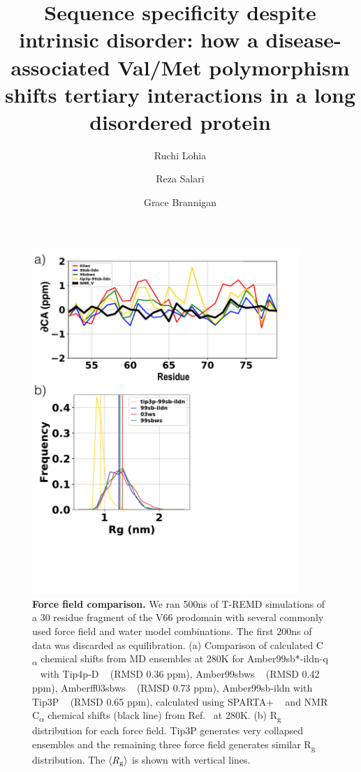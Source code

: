 \documentclass[journal=jacsat,manuscript=article]{achemso}
\author{Ruchi Lohia}
\author{Reza Salari}
\author{Grace Brannigan}
\affiliation[Rutgers University]
{Center for Computational and Integrative Biology, Rutgers University, Camden, NJ, USA}
\title[An \textsf{achemso} demo]
  {Sequence specificity despite intrinsic disorder: how a disease-associated  Val/Met polymorphism shifts tertiary interactions in a long disordered protein}
\begin{document}
\clearpage


\begin{figure}[!ht]
\includegraphics[scale=0.5,width=0.9\textwidth,trim={0 0cm 0 0cm},clip]{../figures/S1.pdf}
\caption{{\bf Force field comparison.} We ran 500ns of T-REMD simulations of a 30 residue fragment of the V66 prodomain with several commonly used force field and water model combinations. The first 200ns of data was discarded as equilibration. (a) Comparison of calculated C\textsubscript{$\alpha$} chemical shifts from MD ensembles at 280K for Amber99sb*-ildn-q ~\cite {Lindorff-Larsen2010a, Hornak2006a} with Tip4p-D ~\cite {Piana2015} (RMSD 0.36 ppm),  Amber99sbws ~\cite {Lindorff-Larsen2010a, Best2014} (RMSD 0.42 ppm), Amberff03sbws  ~\cite {Best2009, Best2014} (RMSD 0.73 ppm), Amber99sb-ildn with Tip3P ~\cite {Jorgensen1981} (RMSD 0.65 ppm), calculated using SPARTA+ ~\cite{Shen2010} and NMR C\textsubscript{$\alpha$} chemical shifts (black line) from Ref.~ at 280K. (b) R\textsubscript{g} distribution for each force field. Tip3P generates very collapsed ensembles and the remaining three force field generates similar R\textsubscript{g} distribution. The $\langle R\textsubscript{g} \rangle$ is shown with vertical lines.}
\label{S1} 
\end{figure}
\end{document}
